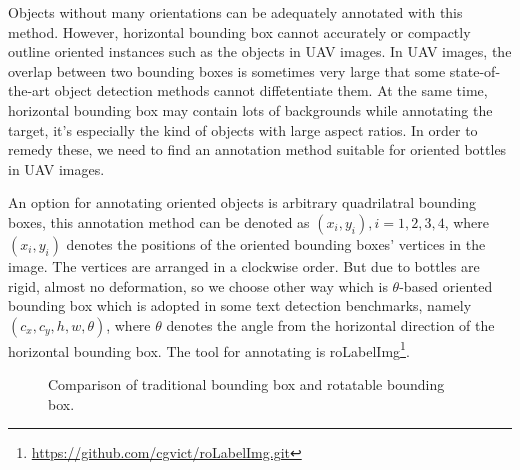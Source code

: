 Objects without many orientations can be adequately annotated with this method. However, horizontal bounding box cannot accurately or compactly outline oriented instances such as the objects in UAV images. In UAV images, the overlap between two bounding boxes is sometimes very large that some state-of-the-art object detection methods cannot diffetentiate them\cite{DOTA}. At the same time, horizontal bounding box may contain lots of backgrounds while annotating the target, it's especially the kind of objects with large aspect ratios. In order to remedy these, we need to find an annotation method suitable for oriented bottles in UAV images.

An option for annotating oriented objects is arbitrary quadrilatral bounding boxes, this annotation method can be denoted as ${(x_i, y_i), i=1,2,3,4}$, where $(x_i, y_i)$ denotes the positions of the oriented bounding boxes' vertices in the image\cite{DOTA}. The vertices are arranged in a clockwise order. But due to bottles are rigid, almost no deformation, so we choose other way which is $\theta$-based oriented bounding box which is adopted in some text detection benchmarks, namely $(c_x, c_y, h, w, \theta)$, where $\theta$ denotes the angle from the horizontal direction of the horizontal bounding box\cite{DOTA}. The tool for annotating is roLabelImg\footnote{\url{https://github.com/cgvict/roLabelImg.git}}.

\begin{figure}
	\centering
	\caption{Comparison of traditional bounding box and rotatable bounding box. }
\end{figure}




